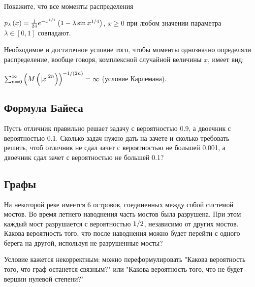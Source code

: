\begin{problem}

Покажите, что все моменты распределения

 $p_{\lambda } \left(x\right)=\frac{1}{24} e^{-x^{{1\mathord{\left/ {\vphantom {1 4}} \right. \kern-\nulldelimiterspace} 4} } } \left(1-\lambda \sin x^{{1\mathord{\left/ {\vphantom {1 4}} \right. \kern-\nulldelimiterspace} 4} } \right)$, $x\ge 0$ при любом значении параметра $\lambda \in \left[0,1\right]$ совпадают.

\begin{remark}

Необходимое и достаточное условие того, чтобы моменты однозначно определяли распределение, вообще говоря, комплексной случайной величины $x$, имеет вид:

\noindent $\sum _{n=0}^{\infty }\left(M\left(\left|x\right|^{2n} \right)\right)^{{-1\mathord{\left/ {\vphantom {-1 \left(2n\right)}} \right. \kern-\nulldelimiterspace} \left(2n\right)} } =\infty  $ (условие Карлемана).
\end{remark}

\end{problem}

\subsection{Формула Байеса}

\begin{problem}
Пусть отличник правильно решает задачу с вероятностью 0.9, а двоечник с вероятностью 0.1. Сколько задач нужно дать на зачете и сколько требовать решить, чтоб отличник не сдал зачет с вероятностью не большей 0.001, а двоечник сдал зачет с вероятностью не большей 0.1?
\end{problem}

\subsection{Графы}

\begin{problem}

На некоторой реке имеется 6 островов, соединенных между собой системой мостов. Во время летнего наводнения часть мостов была разрушена. При этом каждый мост разрушается с вероятностью ${1\mathord{\left/ {\vphantom {1 2}} \right. \kern-\nulldelimiterspace} 2} $, независимо от других мостов. Какова вероятность того, что после наводнения можно будет перейти с одного берега на другой, используя не разрушенные мосты?

\begin{fixme} 
Условие кажется некорректным: можно переформулировать "Какова вероятность того, что граф останется связным?" или "Какова вероятность того, что не будет вершин нулевой степени?"
\end{fixme}

\end{problem}

